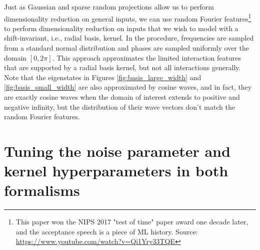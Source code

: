 \documentclass{article}
\begin{document}
Just as Gaussian and sparse random projections\cite{random_projection} allow us to perform dimensionality reduction on general inputs, we can use random Fourier features\cite{random_fourier_features}\footnote{This paper won the NIPS 2017 "test of time" paper award one decade later, and the acceptance speech is a piece of ML history. Source:  \url{https://www.youtube.com/watch?v=Qi1Yry33TQE} }  to perform dimensionality reduction on inputs that we wish to model with a shift-invariant, i.e., radial basis, kernel. In the procedure, frequencies are sampled from a standard normal distribution and phases are sampled uniformly over the domain $[0,2\pi]$. This approach approximates the limited interaction features that are supported by a radial basis kernel, but not all interactions generally. Note that the eigenstates in Figures \ref{fig:basis_large_width} and \ref{fig:basis_small_width} are also approximated by cosine waves, and in fact, they are exactly cosine waves when the domain of interest extends to positive and negative infinity, but the distribution of their wave vectors  don't match the random Fourier features.

\section{Tuning the noise parameter and kernel hyperparameters in both formalisms}\label{sec:hyperparameter_tuning}
\end{document}
